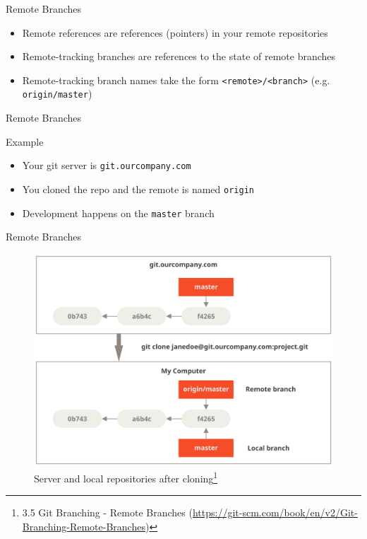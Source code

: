 \documentclass[aspectratio=169]{beamer}
\newcommand{\sectiontitle}{}
\begin{document}
\begin{frame}[fragile]{Remote Branches}{\sectiontitle}
\begin{itemize}
    \item Remote references are references (pointers) in your remote repositories
    \item Remote-tracking branches are references to the state of remote branches
    \item Remote-tracking branch names take the form \verb|<remote>/<branch>| (e.g. \verb|origin/master|)
\end{itemize}
\end{frame}

\begin{frame}[fragile]{Remote Branches}{\sectiontitle}
\begin{block}{Example}
\begin{itemize}
    \item Your git server is \verb|git.ourcompany.com|
    \item You cloned the repo and the remote is named \verb|origin|
    \item Development happens on the \verb|master| branch
\end{itemize}
\end{block}
\end{frame}

\begin{frame}{Remote Branches}{\sectiontitle}
\begin{figure}
    \centering
    \includegraphics[width=\textwidth,height=0.5\textheight,keepaspectratio]{remote-branches-1}
    \caption{
        Server and local repositories after cloning\footnote{
            3.5 Git Branching - Remote Branches
            (\url{https://git-scm.com/book/en/v2/Git-Branching-Remote-Branches})
        }
    }
\end{figure}
\end{frame}
\end{document}
